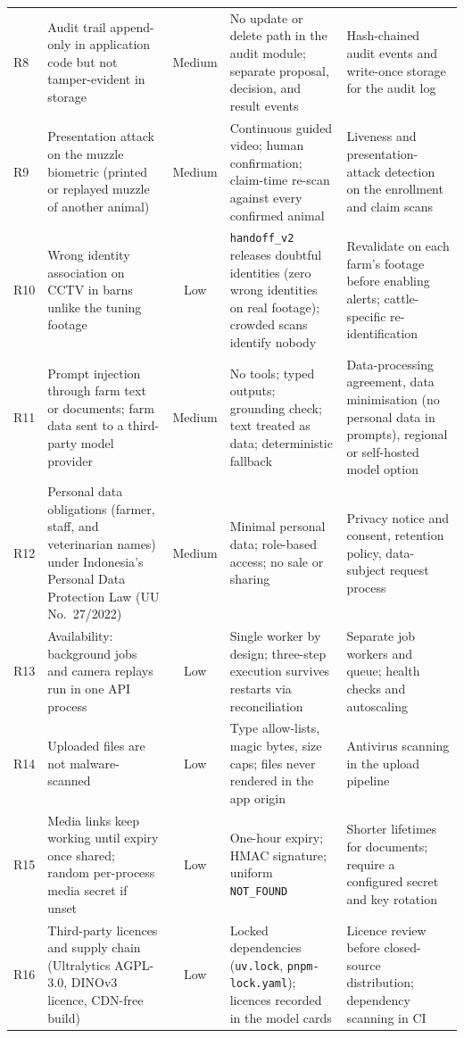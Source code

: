 \documentclass[11pt,letterpaper]{article}
\newcommand{\med}{\cellcolor{orange!22}Medium}
\newcommand{\low}{\cellcolor{green!14}Low}
\begin{document}
{\begin{longtable}{>{\raggedright\arraybackslash}p{0.7cm}>{\raggedright\arraybackslash}p{3.3cm}c>{\raggedright\arraybackslash}p{4.3cm}>{\raggedright\arraybackslash}p{4.6cm}}
R8 & Audit trail append-only in application code but not tamper-evident in storage & \med & No update or delete path in the audit module; separate proposal, decision, and result events & Hash-chained audit events and write-once storage for the audit log \\
R9 & Presentation attack on the muzzle biometric (printed or replayed muzzle of another animal) & \med & Continuous guided video; human confirmation; claim-time re-scan against every confirmed animal & Liveness and presentation-attack detection on the enrollment and claim scans \\
R10 & Wrong identity association on CCTV in barns unlike the tuning footage & \low & \texttt{handoff\_v2} releases doubtful identities (zero wrong identities on real footage); crowded scans identify nobody & Revalidate on each farm's footage before enabling alerts; cattle-specific re-identification \\
R11 & Prompt injection through farm text or documents; farm data sent to a third-party model provider & \med & No tools; typed outputs; grounding check; text treated as data; deterministic fallback & Data-processing agreement, data minimisation (no personal data in prompts), regional or self-hosted model option \\
R12 & Personal data obligations (farmer, staff, and veterinarian names) under Indonesia's Personal Data Protection Law (UU No.~27/2022) & \med & Minimal personal data; role-based access; no sale or sharing & Privacy notice and consent, retention policy, data-subject request process \\
R13 & Availability: background jobs and camera replays run in one API process & \low & Single worker by design; three-step execution survives restarts via reconciliation & Separate job workers and queue; health checks and autoscaling \\
R14 & Uploaded files are not malware-scanned & \low & Type allow-lists, magic bytes, size caps; files never rendered in the app origin & Antivirus scanning in the upload pipeline \\
R15 & Media links keep working until expiry once shared; random per-process media secret if unset & \low & One-hour expiry; HMAC signature; uniform \texttt{NOT\_FOUND} & Shorter lifetimes for documents; require a configured secret and key rotation \\
R16 & Third-party licences and supply chain (Ultralytics AGPL-3.0, DINOv3 licence, CDN-free build) & \low & Locked dependencies (\texttt{uv.lock}, \texttt{pnpm-lock.yaml}); licences recorded in the model cards & Licence review before closed-source distribution; dependency scanning in CI \\
\end{longtable}
}
\end{document}
